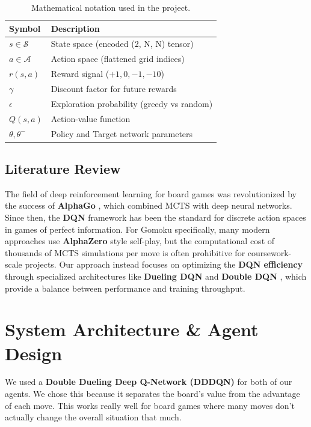 \documentclass[9pt,a4paper,twocolumn,twoside]{rho-class/rho}
\begin{document}
        \begin{table}[h]
            \centering
            \begin{tabular}{lp{5.5cm}}
                \toprule
                Symbol & Description \\
                \midrule
                $s \in \mathcal{S}$ & State space (encoded (2, N, N) tensor) \\
                $a \in \mathcal{A}$ & Action space (flattened grid indices) \\
                $r(s, a)$ & Reward signal ($+1, 0, -1, -10$) \\
                $\gamma$ & Discount factor for future rewards \\
                $\epsilon$ & Exploration probability (greedy vs random) \\
                $Q(s, a)$ & Action-value function \\
                $\theta, \theta^{-}$ & Policy and Target network parameters \\
                \bottomrule
            \end{tabular}
            \caption{Mathematical notation used in the project.}
            \label{tab:notation}
        \end{table}

    \subsection{Literature Review}
        The field of deep reinforcement learning for board games was revolutionized by the success of \textbf{AlphaGo} \cite{mnih2015}, which combined MCTS with deep neural networks. Since then, the \textbf{DQN} framework has been the standard for discrete action spaces in games of perfect information. For Gomoku specifically, many modern approaches use \textbf{AlphaZero} style self-play, but the computational cost of thousands of MCTS simulations per move is often prohibitive for coursework-scale projects. Our approach instead focuses on optimizing the \textbf{DQN efficiency} through specialized architectures like \textbf{Dueling DQN} \cite{wang2016} and \textbf{Double DQN} \cite{hasselt2016}, which provide a balance between performance and training throughput.

\section{System Architecture \& Agent Design}
    We used a \textbf{Double Dueling Deep Q-Network (DDDQN)} for both of our agents. We chose this because it separates the board's value from the advantage of each move. This works really well for board games where many moves don't actually change the overall situation that much.
\end{document}
